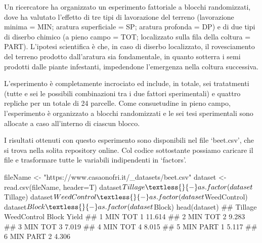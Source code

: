 \documentclass[a4paper,12pt,oneside]{book}
\newenvironment{Shaded}{\begin{snugshade}}{\end{snugshade}}
\newcommand{\SpecialCharTok}[1]{#1}
\newcommand{\StringTok}[1]{#1}
\newcommand{\DocumentationTok}[1]{#1}
\newcommand{\OtherTok}[1]{#1}
\newcommand{\FunctionTok}[1]{#1}
\newcommand{\AttributeTok}[1]{#1}
\newcommand{\NormalTok}[1]{#1}
\begin{document}
Un ricercatore ha organizzato un esperimento fattoriale a blocchi randomizzati, dove ha valutato l'effetto di tre tipi di lavorazione del terreno (lavorazione minima = MIN; aratura superficiale = SP; aratura profonda = DP) e di due tipi di diserbo chimico (a pieno campo = TOT; localizzato sulla fila della coltura = PART). L'ipotesi scientifica è che, in caso di diserbo localizzato, il rovesciamento del terreno prodotto dall'aratura sia fondamentale, in quanto sotterra i semi prodotti dalle piante infestanti, impedendone l'emergenza nella coltura successiva.

L'esperimento è completamente incrociato ed include, in totale, sei tratatmenti (tutte e sei le possibili combinazioni tra i due fattori sperimentali) e quattro repliche per un totale di 24 parcelle. Come consuetudine in pieno campo, l'esperimento è organizzato a blocchi randomizzati e le sei tesi sperimentali sono allocate a caso all'interno di ciascun blocco.

I risultati ottenuti con questo esperimento sono disponibili nel file `beet.csv', che si trova nella solita repository online. Col codice sottostante possiamo caricare il file e trasformare tutte le variabili indipendenti in `factors'.

\begin{Shaded}
\begin{Highlighting}[]
\NormalTok{fileName }\OtherTok{\textless{}{-}} \StringTok{"https://www.casaonofri.it/\_datasets/beet.csv"}
\NormalTok{dataset }\OtherTok{\textless{}{-}} \FunctionTok{read.csv}\NormalTok{(fileName, }\AttributeTok{header=}\NormalTok{T)}
\NormalTok{dataset}\SpecialCharTok{$}\NormalTok{Tillage }\OtherTok{\textless{}{-}} \FunctionTok{as.factor}\NormalTok{(dataset}\SpecialCharTok{$}\NormalTok{Tillage)}
\NormalTok{dataset}\SpecialCharTok{$}\NormalTok{WeedControl }\OtherTok{\textless{}{-}} \FunctionTok{as.factor}\NormalTok{(dataset}\SpecialCharTok{$}\NormalTok{WeedControl)}
\NormalTok{dataset}\SpecialCharTok{$}\NormalTok{Block }\OtherTok{\textless{}{-}} \FunctionTok{as.factor}\NormalTok{(dataset}\SpecialCharTok{$}\NormalTok{Block)}
\FunctionTok{head}\NormalTok{(dataset)}
\DocumentationTok{\#\#   Tillage WeedControl Block  Yield}
\DocumentationTok{\#\# 1     MIN         TOT     1 11.614}
\DocumentationTok{\#\# 2     MIN         TOT     2  9.283}
\DocumentationTok{\#\# 3     MIN         TOT     3  7.019}
\DocumentationTok{\#\# 4     MIN         TOT     4  8.015}
\DocumentationTok{\#\# 5     MIN        PART     1  5.117}
\DocumentationTok{\#\# 6     MIN        PART     2  4.306}
\end{Highlighting}
\end{Shaded}
\end{document}
